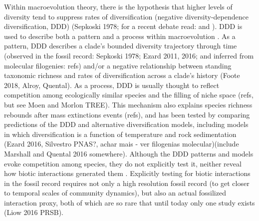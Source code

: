 Within macroevolution theory, there is the hypothesis that higher levels of diversity tend to suppress rates of diversification (negative diversity-dependence diversification, DDD) (Sepkoski 1978; for a recent debate read: \citealt{harmon2015unbounded} and \citealt{rabosky2015limits}). 
DDD is used to describe both a pattern and a process within macroevolution \citep{rabosky2013diversity}. 
As a pattern, DDD describes a clade's bounded diversity trajectory through time (observed in the fossil record: Sepkoski 1978; Ezard 2011, 2016; and inferred from molecular filogenies: refs) and/or a negative relationship between standing taxonomic richness and rates of diversification across a clade's history (Foote 2018, Alroy, Quental).
As a process, DDD is usually thought to reflect competition among ecologically similar species and the filling of niche space (refs, but see Moen and Morlon TREE). This mechanism also explains species richness rebounds after mass extinctions events (refs), and has been tested by comparing predictions of the DDD and alternative diversification models, including models in which diversification is a function of temperature and rock sedimentation (Ezard 2016, Silvestro PNAS?, achar mais - ver filogenias molecular)(include Marshall and Quental 2016 somewhere).
Although the DDD patterns and models evoke competition among species, they do not explicitly test it, neither reveal how biotic interactions generated them \citep{jablonski2008biotic}. 
Explicitly testing for biotic interactions in the fossil record requires not only a high resolution fossil record (to get closer to temporal scales of community dynamics), but also an actual fossilized interaction proxy, both of which are so rare that until today only one study exists (Liow 2016 PRSB).


